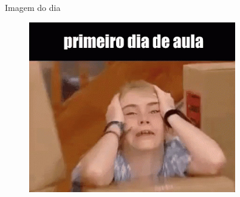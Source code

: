 \documentclass{beamer}
\begin{document}
\begin{frame}[fragile]{Imagem do dia}

    \begin{figure}[H]
        \centerline{\includegraphics[width=0.8\textwidth]{assets/imagem-do-dia/primeiro-dia-aula.jpg}}
        
    \end{figure}
\end{frame}

\backmatter
\end{document}
